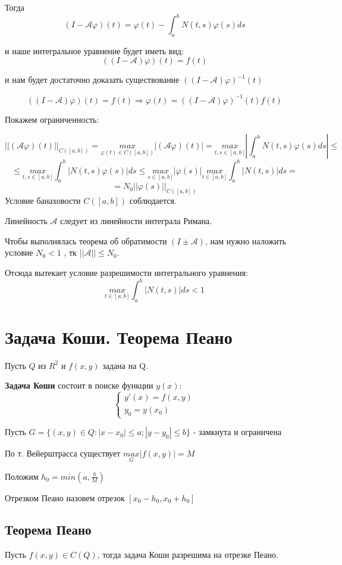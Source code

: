 \documentclass[12pt]{article}
\begin{document}
	Тогда $$(I - \mathcal{A}\varphi)(t) = \varphi(t) - \int_a^b N(t,s)\varphi(s)ds$$
	
	и наше интегральное уравнение будет иметь вид:
	$$((I - \mathcal{A})\varphi)(t) = f(t)$$
	
	и нам будет достаточно доказать существование $((I - \mathcal{A})\varphi)^{-1}(t)$
	
	$$((I - \mathcal{A})\varphi)(t) = f(t) \Rightarrow \varphi(t) = ((I - \mathcal{A})\varphi)^{-1}(t) f(t) $$
	
	Покажем ограниченность:
	
	$$||(\mathcal{A}\varphi)(t)||_{C([a,b])} = \underset{\varphi(t) \in C([a,b])} {max} |(\mathcal{A}\varphi)(t)| = \underset{t,s \in [a,b]}{max}|\int_a^b N(t,s)\varphi(s)ds| \le $$
	$$\le \underset{t,s \in [a,b]} {max} \int_a^b |N(t,s)\varphi(s)|ds \le \underset{s \in [a,b]} {max} |\varphi(s)| 
    \underset{t \in [a,b]} {max}\int_a^b |N(t,s)|ds = $$
	$$ = N_0||\varphi(s)||_{C([a,b])}	$$
	Условие банаховости $C([a,b])$ соблюдается.
	
	Линейность $\mathcal{A}$ следует из линейности интеграла Римана.
	
	Чтобы выполнялась теорема об обратимости $(I \pm \mathcal{A})$, нам нужно наложить условие $N_0 < 1$
, тк $||\mathcal{A}|| \le N_0$. 

Отсюда вытекает условие разрешимости интегрального уравнения:
	$$\underset{t \in [a,b]} {max}\int_a^b |N(t,s)|ds < 1$$ 
	

\section{Задача Коши. Теорема Пеано}
	Пусть $Q$ из $R^2$ и $f(x,y)$ задана на Q.
	
	\textbf{Задача Коши} состоит в поиске функции $y(x)$:
$$
\begin{cases}
   y'(x) = f(x,y) \\
   y_0 = y(x_0)
\end{cases}
$$

Пусть $G = \{(x,y) \in Q : |x - x_0| \le a; |y - y_0| \le b \}$ - замкнута и ограничена

По т. Вейерштрасса существует $\underset{G}{max} |f(x,y)| = M$

Положим $h_0 = min(a , \frac{b}{M})$

Отрезком Пеано назовем отрезок $[x_0 - h_0, x_0 + h_0]$
\subsection{Теорема Пеано} Пусть $f(x,y) \in C(Q)$, тогда задача Коши разрешима на отрезке Пеано.
\end{document}
